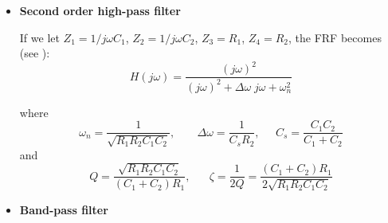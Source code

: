 \documentclass{article}
\begin{document}
\begin{itemize}
\item {\bf Second order high-pass filter}
    
  If we let $Z_1=1/j\omega C_1$, $Z_2=1/j\omega C_2$, $Z_3=R_1$, $Z_4=R_2$, 
  the FRF becomes (see
  ):
  \begin{equation}
  H(j\omega)=\frac{(j\omega)^2}{(j\omega)^2+\Delta\omega\;j\omega+\omega_n^2}
  \end{equation}
  \begin{comment}
  \begin{eqnarray}
    H&=&\frac{R_1R_2}
    {1/(j\omega)^2C_1C_2+R_1(1/j\omega C_1+1/j\omega C_2)+R_1R_2}
    \nonumber \\
    &=&\frac{(j\omega)^2}{1/R_1R_2C_1C_2+j\omega\;(C_1+C_2)/C_1C_2R_2+(j\omega)^2}
    \nonumber \\
    &=&\frac{(j\omega)^2}{(j\omega)^2+j\omega\;/C_sR_2+1/R_1R_2C_1C_2}
    \nonumber \\
    &=&\frac{(j\omega)^2}{(j\omega)^2+2\zeta\omega_n\;j\omega+\omega_n^2} 
    =\frac{(j\omega)^2}{(j\omega)^2+\omega_n/Q \;j\omega+\omega_n^2} 
    =\frac{(j\omega_n)^2}{(j\omega)^2+\Delta\omega\;j\omega+\omega_n^2}
  \end{eqnarray}
  \end{comment}
  where 
  \begin{equation}
  \omega_n=\frac{1}{\sqrt{R_1R_2C_1C_2}},\;\;\;\;\;\;\;
  \Delta\omega=\frac{1}{C_sR_2},\;\;\;\;\;
  C_s=\frac{C_1C_2}{C_1+C_2}
  \end{equation}
  and
  \begin{equation}
  Q=\frac{\sqrt{R_1R_2C_1C_2}}{(C_1+C_2)R_1},\;\;\;\;\;\;
  \zeta=\frac{1}{2Q}=\frac{(C_1+C_2)R_1}{2\sqrt{R_1R_2C_1C_2}}
  \end{equation}

\item {\bf Band-pass filter}



\end{itemize}
\end{document}
